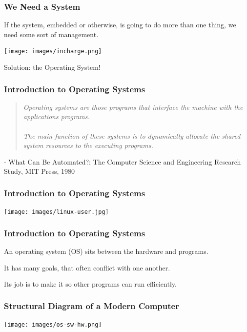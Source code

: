 \begin{frame}
\frametitle{We Need a System}

If the system, embedded or otherwise, is going to do more than one thing, we need some sort of management.

\begin{center}
  \texttt{[image: images/incharge.png]}
\end{center}

Solution: the Operating System!

\end{frame}

\begin{frame}
\frametitle{Introduction to Operating Systems}

\begin{quote}
\textit{Operating systems are those programs that interface the machine with the applications programs.}
~\\~\\
\textit{The main function of these systems is to dynamically allocate the shared system resources to the executing programs.}
\end{quote}

\hfill - What Can Be Automated?: The Computer Science and Engineering Research Study, MIT Press, 1980

\end{frame}


\begin{frame}
\frametitle{Introduction to Operating Systems}

\begin{center}
	\texttt{[image: images/linux-user.jpg]}
\end{center}


\end{frame}


\begin{frame}
\frametitle{Introduction to Operating Systems}

An operating system (OS) sits between the hardware and programs.

It has many goals, that often conflict with one another.

Its job is to make it so other programs can run efficiently.

\end{frame}

\begin{frame}
\frametitle{Structural Diagram of a Modern Computer}

\begin{center}
\texttt{[image: images/os-sw-hw.png]}
\end{center}

\end{frame}


